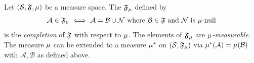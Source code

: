 \begin{definition}%
	\label{def:measureability}
	Let \( (\mathcal{S}, \mathfrak{F}, \mu) \) be a measure space.
	The \SigmaAlgebra{} \( \mathfrak{F}_\mu \) defined by
	\begin{equation}
		\mathcal{A} \in \SigmaAlgebraSymbol_\Measure \iff \mathcal{A} = \mathcal{B} \cup \mathcal{N}\ \text{where}\ \mathcal{B} \in \SigmaAlgebraSymbol\ \text{and}\ \mathcal{N}\ \text{is \(\Measure\)-null}
	\end{equation}
	is the \emph{completion} of \( \mathfrak{F} \) with respect to \( \mu \).
	The elements of \( \mathfrak{F}_\mu \) are \emph{\( \mu \)-measurable}.
	The measure \( \mu \) can be extended to a measure \( \mu^\ast \) on \( (\mathcal{S}, \mathfrak{F}_\mu) \) via \( \mu^\ast(\mathcal{A}) = \mu(\mathcal{B}) \) with \( \mathcal{A}, \mathcal{B} \) as defined above.
\end{definition}

